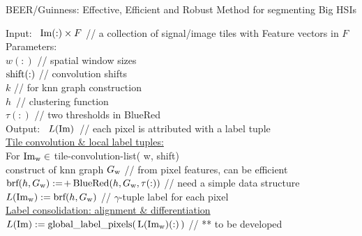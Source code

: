 

\begin{algorithm}[H] 
  \caption{  \footnotesize
    BEER/Guinness: Effective, Efficient and Robust Method for
    segmenting Big HSIs
    \label{alg:ben-tile} }
  \SetAlgoLined
  {Input:\ } ${\rm Im}(:) \times F$ \phantom{space}
  // {\footnotesize a collection of signal/image tiles with Feature vectors in $F$}
  \\
  {\rm Parameters:\ }
  \\
  \phantom{Input:\ } $w(:)$ \phantom{make space}
  // {\footnotesize spatial window sizes}
  \\
  \phantom{Input:\ } $ {\rm shift}(:) $ \phantom{space xxx}
  // {\footnotesize convolution shifts}
  \\
  \phantom{Input:\ } $ k $ \phantom{make space xxx}
  // {\footnotesize for knn graph construction}
  \\
  \phantom{Input:\ } $h$\, \phantom{make space xx}
  // {\footnotesize clustering function}
  \\
  \phantom{Input:\ } $ \tau(:) $ \phantom{make space}
  // {\footnotesize two thresholds in BlueRed}
  \\
  {\rm Output:\ } $L(\rm Im)$\, \phantom{space}
  // {\footnotesize each pixel is attributed with a label tuple}
  \\
  \underline{Tile convolution \& local label tuples:}
  \\ 
  For $\mbox{\rm Im}_{\rm w}  \in$ {\rm tile-convolution-list}( w, shift)
  \\
  \phantom{xxx} construct of knn graph $G_{\rm w}$
  \phantom{make space }
  // {\footnotesize from pixel features, can be efficient}  
  \\
  \phantom{xxx}
  $\mbox{\rm brf}(h,G_{\rm w}) :=\!+\! {\  }
    \mbox{\rm BlueRed}( h,G_{\rm w}, \tau(:) )$
    \phantom{xxxx}
    // {\footnotesize need a simple data structure}  
  \\
  \phantom{xxx}
  $L({\rm Im}_{\rm w}) := \mbox{\rm brf}(h,G_{\rm w})$
  \phantom{make space to align}
  // {\footnotesize $\gamma$-tuple label for each pixel } 
  \\
  \underline{Label consolidation: alignment \& differentiation}
  \\
  $L(\rm Im) := \mbox{\rm global\_label\_pixels}(\, L(\mbox{\rm Im}_{w})(:)\, ) $ 
  \phantom{xxx} // {\footnotesize *** to be developed } 
  \\
  \phantom{make invisible space}
\end{algorithm}

\newpage

